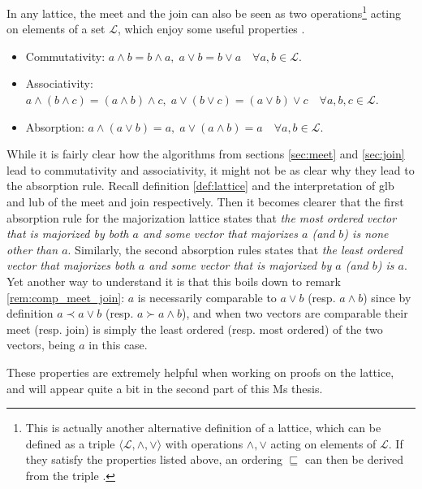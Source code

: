 In any lattice, the meet and the join can also be seen as two operations\footnote{This is actually another alternative definition of a lattice, which can be defined as a triple $\langle \mathcal{L}, \wedge, \vee \rangle$ with operations $\wedge, \vee$ acting on elements of $\mathcal{L}$. If they satisfy the properties listed above, an ordering $\sqsubseteq$ can then be derived from the triple \cite[p. 47]{dominich_elements_2008}.}
acting on elements of a set $\mathcal{L}$, which enjoy some useful properties \cite[p. 46]{dominich_elements_2008}.

\begin{itemize} \label{it:meet_join_properties}
    \item Commutativity: $a \wedge b = b \wedge a, \; a \vee b = b \vee a \quad \forall a, b \in \mathcal{L}$.
    \item Associativity: $a \wedge (b \wedge c) = (a \wedge b) \wedge c, \;
                            a \vee (b \vee c) = (a \vee b) \vee c \quad \forall a, b, c \in \mathcal{L}$.
    \item Absorption: $a \wedge (a \vee b) = a, \; a \vee (a \wedge b) = a \quad \forall a, b \in \mathcal{L}$.
\end{itemize}

While it is fairly clear how the algorithms from sections \ref{sec:meet} and \ref{sec:join} lead to commutativity and associativity, it might not be as clear why they lead to the absorption rule. Recall definition \ref{def:lattice} and the interpretation of glb and lub of the meet and join respectively. Then it becomes clearer that the first absorption rule for the majorization lattice states that \textit{the most ordered vector that is majorized by both $a$ and some vector that majorizes $a$ (and $b$) is none other than $a$}. Similarly, the second absorption rules states that \textit{the least ordered vector that majorizes both $a$ and some vector that is majorized by $a$ (and $b$) is $a$}. Yet another way to understand it is that this boils down to remark \ref{rem:comp_meet_join}: $a$ is necessarily comparable to $a \vee b$ (resp. $a \wedge b$) since by definition $a \prec a \vee b$ (resp. $a \succ a \wedge b$), and when two vectors are comparable their meet (resp. join) is simply the least ordered (resp. most ordered) of the two vectors, being $a$ in this case.


These properties are extremely helpful when working on proofs on the lattice, and will appear quite a bit in the second part of this Ms thesis.



